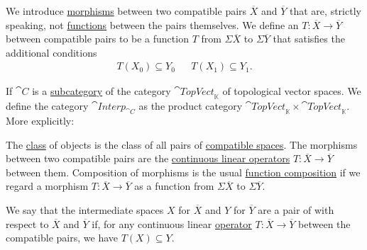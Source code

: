 \begin{definition}
\begin{thmenum}
     We introduce \hyperref[def:category/morphisms]{morphisms} between two compatible pairs \( \overline{X} \) and \( \overline{Y} \) that are, strictly speaking, not \hyperref[def:function]{functions} between the pairs themselves. We define an  \( T: \overline{X} \to \overline{Y} \) between compatible pairs to be a function \( T \) from \( \Sigma \overline{X} \) to \( \Sigma \overline{Y} \) that satisfies the additional conditions
    \begin{align*}
      T(X_0) \subseteq Y_0
      &&
      T(X_1) \subseteq Y_1.
    \end{align*}

     If \( \cat{C} \) is a \hyperref[def:subcategory]{subcategory} of the category \hyperref[def:category_of_topological_vector_spaces]{\( \cat{TopVect}_{\BbbK} \)} of topological vector spaces. We define the category \( \cat{Interp}_{\cat{C}} \) as the product category \( \cat{TopVect}_{\BbbK} \times \cat{TopVect}_{\BbbK} \). More explicitly:
    \begin{refenum}
       The \hyperref[def:set]{class} of objects is the class of all pairs of \hyperref[def:interpolated_topological_vector_space/compatibility]{compatible spaces}.
       The morphisms between two compatible pairs are the \hyperref[def:interpolated_topological_vector_space/morphisms]{continuous linear operators} \( T: \overline{X} \to \overline{Y} \) between them.
       Composition of morphisms is the usual \hyperref[def:set_valued_map/composition]{function composition} if we regard a morphism \( T: \overline{X} \to \overline{Y} \) as a function from \( \Sigma \overline{X} \) to \( \Sigma \overline{Y} \).
    \end{refenum}

     We say that the intermediate spaces \( X \) for \( \overline{X} \) and \( Y \) for \( \overline{Y} \) are a pair of  with respect to \( \overline{X} \) and \( \overline{Y} \) if, for any continuous linear \hyperref[def:interpolated_topological_vector_space/morphisms]{operator} \( T: \overline{X} \to \overline{Y} \) between the compatible pairs, we have \( T(X) \subseteq Y \).
  \end{thmenum}
\end{definition}

